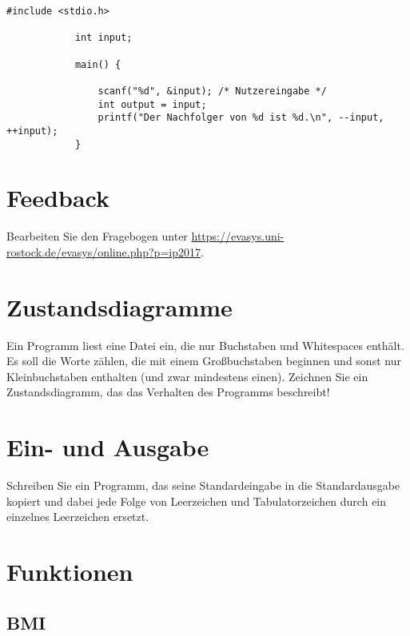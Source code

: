 \documentclass[]{article}
\begin{document}
	\quad
	\begin{minipage}{0.5\linewidth} %
		\begin{lstlisting}[gobble=6]
			#include <stdio.h>
			
			int input;
			
			main() {
				
				scanf("%d", &input); /* Nutzereingabe */
				int output = input;
				printf("Der Nachfolger von %d ist %d.\n", --input, ++input);
			}	
		\end{lstlisting}
	\end{minipage}
	
	\section{Feedback}
	
	Bearbeiten Sie den Fragebogen unter \href{https://evasys.uni-rostock.de/evasys/online.php?p=ip2017}{https://evasys.uni-rostock.de/evasys/online.php?p=ip2017}.
	
	\section{Zustandsdiagramme}
	
	Ein Programm liest eine Datei ein, die nur Buchstaben und Whitespaces enthält.
	Es soll die Worte zählen, die mit einem Großbuchstaben beginnen und sonst nur Kleinbuchstaben enthalten (und zwar mindestens einen).
	Zeichnen Sie ein Zustandsdiagramm, das das Verhalten des Programms beschreibt!
	
	\vspace{50ex}
	
	\section{Ein- und Ausgabe}
	
	Schreiben Sie ein Programm, das seine Standardeingabe in die Standardausgabe kopiert und dabei jede Folge von Leerzeichen und Tabulatorzeichen durch ein einzelnes Leerzeichen ersetzt.
	
	\section{Funktionen}
	
	\subsection{BMI}
	
\end{document}
